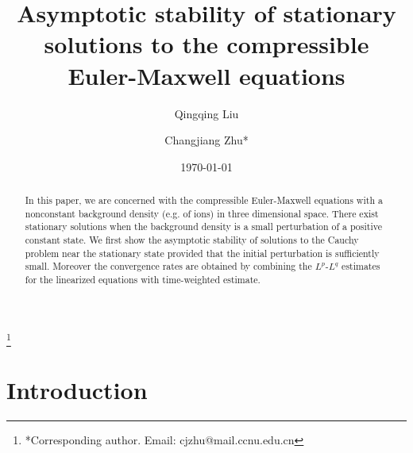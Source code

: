 \documentclass[11pt]{amsart}
\numberwithin{equation}{section}
\begin{document}
\title[Asymptotic stability of the compressible Euler-Maxwell equations ]
 {Asymptotic stability of stationary
solutions to the compressible Euler-Maxwell equations }

\author{Qingqing Liu}
\address{(QQL)
The Hubei Key Laboratory of Mathematical Physics, School of
Mathematics and Statistics, Central China Normal University, Wuhan,
430079, P. R. China} 

\author{Changjiang Zhu*}
\address{(CJZ)
The Hubei Key Laboratory of Mathematical Physics, School of
Mathematics and Statistics, Central China Normal University, Wuhan,
430079, P. R. China} 
\thanks{*Corresponding author. Email: cjzhu@mail.ccnu.edu.cn }

\date{\today}


\begin{abstract}
In this paper, we are concerned with the compressible Euler-Maxwell
equations with a nonconstant background density (e.g. of ions) in
three dimensional space. There exist stationary solutions when the
background density is a small perturbation of a positive constant
state. We first show the asymptotic stability of solutions to the
Cauchy problem near the stationary state provided that the initial
perturbation is sufficiently small. Moreover the convergence rates
are obtained by combining the $L^p$-$L^q$ estimates for the
linearized equations with time-weighted estimate.
\end{abstract}

\maketitle

\tableofcontents

\section{Introduction}
\end{document}
